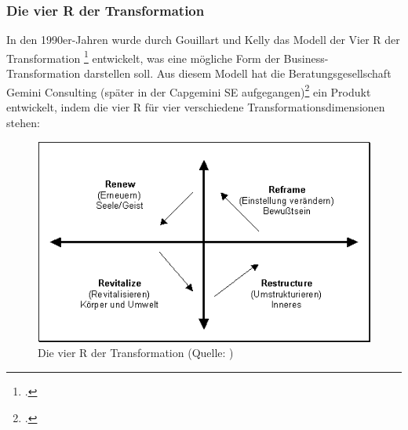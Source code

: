 \subsubsection{Die vier R der Transformation}
In den 1990er-Jahren wurde durch Gouillart und Kelly das Modell der \glqq{}Vier R der Transformation\grqq{} \footcite[Vgl.][]{4r-modell} entwickelt, was eine mögliche Form der Business-Transformation darstellen soll. Aus diesem Modell hat die Beratungsgesellschaft Gemini Consulting (später in der Capgemini SE aufgegangen)\footcite[Vgl.][]{gemini-died} ein Produkt entwickelt, indem die vier R für vier verschiedene Transformationsdimensionen stehen:\\
\begin{figure}[h]
    \centering
    \includegraphics[scale=0.5]{Bilder/businesstransformationManagementportal.png}
    \caption[Die vier R der Transformation]{Die vier R der Transformation (Quelle: \cite[][]{4r-modell})}
\end{figure}

